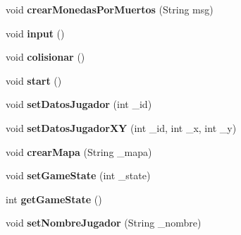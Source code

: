 \begin{DoxyCompactItemize}
\item 
\hypertarget{classBatallaEspacial_1_1Juego_ad83daebeb9d0415474f60b98fe107631}{
void {\bfseries crearMonedasPorMuertos} (String msg)}
\label{classBatallaEspacial_1_1Juego_ad83daebeb9d0415474f60b98fe107631}

\item 
\hypertarget{classBatallaEspacial_1_1Juego_a89aba17b3540c558097299146f1c8c2c}{
void {\bfseries input} ()}
\label{classBatallaEspacial_1_1Juego_a89aba17b3540c558097299146f1c8c2c}

\item 
\hypertarget{classBatallaEspacial_1_1Juego_ab62b36bb44271e26e869868219344263}{
void {\bfseries colisionar} ()}
\label{classBatallaEspacial_1_1Juego_ab62b36bb44271e26e869868219344263}

\item 
\hypertarget{classBatallaEspacial_1_1Juego_a304817b212deb17c27afb95c70efa7fd}{
void {\bfseries start} ()}
\label{classBatallaEspacial_1_1Juego_a304817b212deb17c27afb95c70efa7fd}

\item 
\hypertarget{classBatallaEspacial_1_1Juego_a49a337746fb7c43c4a0f8d487077f619}{
void {\bfseries setDatosJugador} (int \_\-id)}
\label{classBatallaEspacial_1_1Juego_a49a337746fb7c43c4a0f8d487077f619}

\item 
\hypertarget{classBatallaEspacial_1_1Juego_af15c761f6e2b48615078cb51d2c17216}{
void {\bfseries setDatosJugadorXY} (int \_\-id, int \_\-x, int \_\-y)}
\label{classBatallaEspacial_1_1Juego_af15c761f6e2b48615078cb51d2c17216}

\item 
\hypertarget{classBatallaEspacial_1_1Juego_afe4506f4253195f0e42dca36a9a16169}{
void {\bfseries crearMapa} (String \_\-mapa)}
\label{classBatallaEspacial_1_1Juego_afe4506f4253195f0e42dca36a9a16169}

\item 
\hypertarget{classBatallaEspacial_1_1Juego_abd8b8ad38e8965be83e9fdceda042cf3}{
void {\bfseries setGameState} (int \_\-state)}
\label{classBatallaEspacial_1_1Juego_abd8b8ad38e8965be83e9fdceda042cf3}

\item 
\hypertarget{classBatallaEspacial_1_1Juego_a0088967edd1b4da56e451f4066c90d8a}{
int {\bfseries getGameState} ()}
\label{classBatallaEspacial_1_1Juego_a0088967edd1b4da56e451f4066c90d8a}

\item 
\hypertarget{classBatallaEspacial_1_1Juego_aa68df7b9fcdf77f36e22fa649d2e504d}{
void {\bfseries setNombreJugador} (String \_\-nombre)}
\label{classBatallaEspacial_1_1Juego_aa68df7b9fcdf77f36e22fa649d2e504d}


\end{DoxyCompactItemize}
